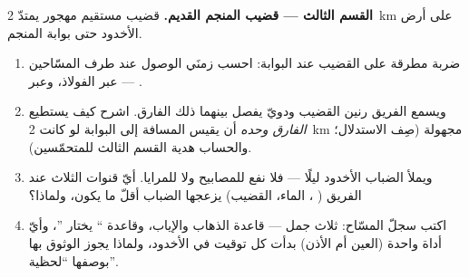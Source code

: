 \begin{problem}
\medskip\noindent\textbf{القسم الثالث --- قضيب المنجم القديم.}
قضيب مستقيم مهجور يمتدّ \qty{2}{km} على أرض الأخدود حتى بوابة
المنجم.
\begin{enumerate}[resume]
  \item ضربة مطرقة على القضيب عند البوابة: احسب زمنَي الوصول
        عند طرف المسّاحين --- عبر الفولاذ، وعبر .
  \item ويسمع الفريق رنين القضيب ودويّ  يفصل بينهما ذلك
        الفارق. اشرح كيف يستطيع \emph{الفارق وحده} أن يقيس
        المسافة إلى البوابة لو كانت \qty{2}{km} مجهولة (صِف
        الاستدلال؛ والحساب هدية القسم الثالث للمتحمّسين).
  \item ويملأ الضباب الأخدود ليلًا --- فلا نفع للمصابيح ولا
        للمرايا. أيّ قنوات  الثلاث عند الفريق (
        ،  الماء،  القضيب) يزعجها الضباب أقلّ ما
        يكون، ولماذا؟
  \item اكتب سجلّ المسّاح: ثلاث جمل --- قاعدة الذهاب
        والإياب، وقاعدة `` يختار ''، وأيّ أداة
        واحدة (العين أم الأذن) بدأت كل توقيت في الأخدود،
        ولماذا يجوز الوثوق بها بوصفها ``لحظية''.
\end{enumerate}
\end{problem}
